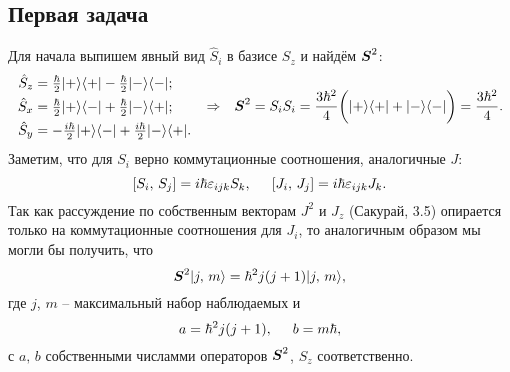 \subsection*{Первая задача}

Для начала выпишем явный вид $\hat{S}_i$ в базисе $S_z$ и найдём $\mbox{\boldmath $S$}^2$:
\begin{equation*}
    \left.\begin{aligned}
        \hat{S}_z &= \textstyle \frac{\hbar}{2} | + \rangle \langle + | - 
        \textstyle \frac{\hbar}{2} | - \rangle \langle - |; \\
        \hat{S}_x &= \textstyle \frac{\hbar}{2} | + \rangle \langle - | 
        + \textstyle \frac{\hbar}{2} | - \rangle \langle + |; \\ 
        \hat{S}_y &= - \textstyle \frac{i \hbar}{2} | + \rangle \langle - |  + 
        \textstyle \frac{i \hbar}{2} | - \rangle \langle + |.
    \end{aligned}\right.
    \hspace{0.25cm} \Rightarrow \hspace{0.25cm}
    \mbox{\boldmath $S$}^2 = S_{i} S_{i} = \frac{3 \hbar^2}{4} \bigg(
        | + \rangle \langle + |  + | - \rangle \langle - | 
    \bigg) = \frac{3 \hbar^2}{4}.
\end{equation*}
Заметим, что для $S_i$ верно коммутационные соотношения, аналогичные $J$:
\begin{equation*}
    \left[S_i,\, S_j\right] = i \hbar \varepsilon_{ijk} S_k, \hspace{5 mm} 
    \left[J_i,\, J_j\right] = i \hbar \varepsilon_{ijk} J_k.
\end{equation*}
Так как рассуждение по собственным векторам $J^2$ и $J_z$ (Сакурай, 3.5) опирается только на коммутационные соотношения для $J_i$, то аналогичным образом мы могли бы получить, что
\begin{equation*}
    \mbox{\boldmath $S$}^2 | j,\, m\rangle  = \hbar^2 j (j + 1) | j,\, m\rangle,
\end{equation*}
где $j$, $m$ -- максимальный набор наблюдаемых и 
\begin{equation*}
    a = \hbar^2 j(j + 1), \hspace{5 mm} b = m \hbar,
\end{equation*}
с $a,\, b$ собственными числамми операторов $\mbox{\boldmath $S$}^2$, $S_z$ соответственно.

